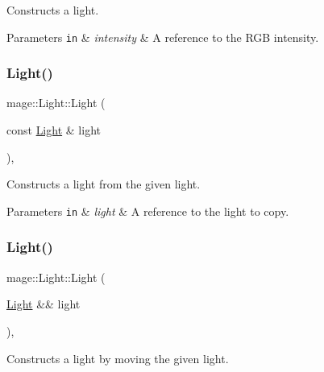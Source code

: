 Constructs a light.


\begin{DoxyParams}[1]{Parameters}
\mbox{\tt in}  & {\em intensity} & A reference to the R\+GB intensity. \\
\hline
\end{DoxyParams}
\hypertarget{classmage_1_1_light_aa91ba3fde50487939d99252c73f732cc}{}\label{classmage_1_1_light_aa91ba3fde50487939d99252c73f732cc} 
\subsubsection{\texorpdfstring{Light()}{Light()}\hspace{0.1cm}{\footnotesize\ttfamily [3/4]}}
{\footnotesize\ttfamily mage\+::\+Light\+::\+Light (\begin{DoxyParamCaption}\item[{const \hyperlink{classmage_1_1_light}{Light} \&}]{light }\end{DoxyParamCaption})\hspace{0.3cm}{\ttfamily [protected]}, {\ttfamily [default]}}

Constructs a light from the given light.


\begin{DoxyParams}[1]{Parameters}
\mbox{\tt in}  & {\em light} & A reference to the light to copy. \\
\hline
\end{DoxyParams}
\hypertarget{classmage_1_1_light_a75343c11264fa27c4f166caaf0fec880}{}\label{classmage_1_1_light_a75343c11264fa27c4f166caaf0fec880} 
\subsubsection{\texorpdfstring{Light()}{Light()}\hspace{0.1cm}{\footnotesize\ttfamily [4/4]}}
{\footnotesize\ttfamily mage\+::\+Light\+::\+Light (\begin{DoxyParamCaption}\item[{\hyperlink{classmage_1_1_light}{Light} \&\&}]{light }\end{DoxyParamCaption})\hspace{0.3cm}{\ttfamily [protected]}, {\ttfamily [default]}}

Constructs a light by moving the given light.


